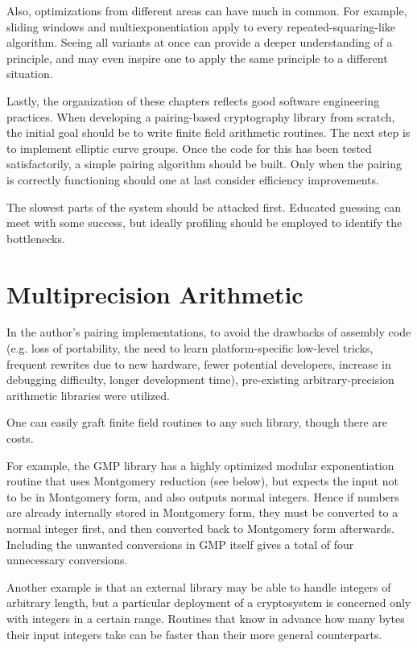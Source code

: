 Also, optimizations from different areas can have much in common. For example,
sliding windows and multiexponentiation apply to every repeated-squaring-like
algorithm. Seeing all variants at once can provide a deeper understanding of
a principle, and may even inspire one to apply the same principle to a
different situation.

Lastly, the organization of these chapters reflects good software
engineering practices. When developing a pairing-based cryptography
library from scratch,
the initial goal should be to write finite field arithmetic
routines. The next step is to implement elliptic curve groups.
Once the code for this has been tested satisfactorily, a simple
pairing algorithm should be built.
Only when the pairing is correctly functioning
should one at last consider efficiency improvements.

The slowest parts of the system should be attacked first.
Educated guessing can meet with some success, but
ideally profiling should be employed to identify the
bottlenecks.

\section{Multiprecision Arithmetic}

In the author's pairing implementations, to avoid the drawbacks
of assembly code (e.g. loss of portability, the need to learn platform-specific
low-level tricks, frequent rewrites due to new hardware,
fewer potential developers, increase in debugging difficulty, longer
development time),
pre-existing arbitrary-precision arithmetic libraries
were utilized.

One can easily graft finite field routines to any such library,
though there are costs.

For example, the GMP library has a highly optimized modular exponentiation
routine that uses Montgomery reduction (see below),
but expects the input not to be
in Montgomery form, and also outputs normal integers.
Hence if numbers are already internally stored in Montgomery form,
they must be converted to a normal integer first, and then converted
back to Montgomery form afterwards. Including the unwanted conversions in
GMP itself gives a total of four unnecessary conversions.

Another example is that an external library may be able to handle integers
of arbitrary length, but a particular deployment of a cryptosystem is
concerned only with integers in a certain range. Routines that know
in advance how many bytes their input integers take can be faster than
their more general counterparts.

